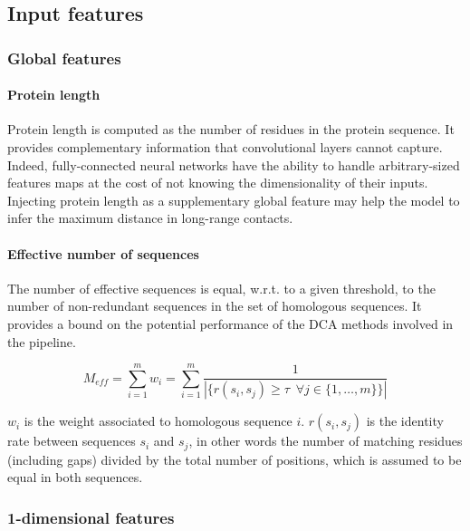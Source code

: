 \subsection{Input features} \label{inputfeatures}

    \subsubsection{Global features}

        \paragraph{Protein length}

      	    Protein length is computed as the number of residues in the protein sequence.
    	    It provides complementary information that convolutional layers cannot capture.
     	    Indeed, fully-connected neural networks have the ability to handle arbitrary-sized
    	    features maps at the cost of not knowing the dimensionality of their inputs.
    	    Injecting protein length as a supplementary global feature may help the model
    	    to infer the maximum distance in long-range contacts.

	   \paragraph{Effective number of sequences} \label{meff}

    	    The number of effective sequences is equal, w.r.t. to a given threshold,
    	    to the number of non-redundant sequences in the set of homologous sequences.
    	    It provides a bound on the potential performance of the DCA methods involved
    	    in the pipeline.

            \begin{equation}
                M_{eff} = \sum_{i=1}^m w_i = \sum_{i=1}^m \frac{1}{|\{r(s_i, s_j) \ge \tau \, \, \, \forall j \in \{1, \dotsc, m\}\}|}
            \end{equation}

            $w_i$ is the weight associated to homologous sequence $i$.
            $r(s_i, s_j)$ is the identity rate between sequences $s_i$ and $s_j$, in other words
            the number of matching residues (including gaps) divided by the total number of positions,
            which is assumed to be equal in both sequences.

    \subsubsection{1-dimensional features}

